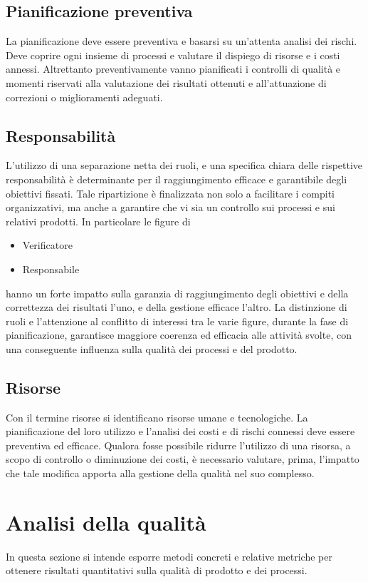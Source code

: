 \documentclass[12pt,a4paper]{article}
\begin{document}
\subsection{Pianificazione preventiva}
La pianificazione deve essere preventiva e basarsi su un'attenta analisi dei rischi. Deve coprire ogni insieme di processi e valutare il dispiego di risorse e i costi annessi. 
Altrettanto preventivamente vanno pianificati i controlli di qualità e momenti riservati alla valutazione dei risultati ottenuti e all'attuazione di correzioni o miglioramenti adeguati.

\subsection{Responsabilità}
L'utilizzo di una separazione netta dei ruoli, e una specifica chiara delle rispettive responsabilità è determinante per il raggiungimento efficace e garantibile degli obiettivi fissati.
Tale ripartizione è finalizzata non solo a facilitare i compiti organizzativi, ma anche a garantire che vi sia un controllo sui processi e sui relativi prodotti.
In particolare le figure di
\begin{itemize}
	\item Verificatore
	\item Responsabile
\end{itemize}
hanno un forte impatto sulla garanzia di raggiungimento degli obiettivi e della correttezza dei risultati l'uno, e della gestione efficace l'altro.
La distinzione di ruoli e l'attenzione al conflitto di interessi tra le varie figure, durante la fase di pianificazione, garantisce maggiore coerenza ed efficacia alle attività svolte, con una conseguente influenza sulla qualità dei  processi e del prodotto.


\subsection{Risorse}\label{risorse}
Con il termine risorse si identificano risorse umane e tecnologiche. La pianificazione del loro utilizzo e l'analisi dei costi e di rischi connessi deve essere preventiva ed efficace.
Qualora fosse possibile ridurre l'utilizzo di una risorsa, a scopo di controllo o diminuzione dei costi, è necessario valutare, prima, l'impatto che tale modifica apporta alla gestione della qualità nel suo complesso.

\newpage

\section{Analisi della qualità}\label{analisi}
In questa sezione si intende esporre metodi concreti e relative metriche per ottenere risultati quantitativi sulla qualità di prodotto e dei processi. 
\end{document}
